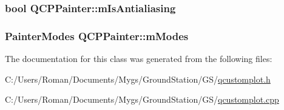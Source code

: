 \subsubsection[{m\+Is\+Antialiasing}]{\setlength{\rightskip}{0pt plus 5cm}bool Q\+C\+P\+Painter\+::m\+Is\+Antialiasing\hspace{0.3cm}{\ttfamily [protected]}}\label{class_q_c_p_painter_a7055085da176aee0f6b23298f1003d08}
\hypertarget{class_q_c_p_painter_af5d1d6e5df0adbc7de5633250fb3396c}{}
\subsubsection[{m\+Modes}]{\setlength{\rightskip}{0pt plus 5cm}Painter\+Modes Q\+C\+P\+Painter\+::m\+Modes\hspace{0.3cm}{\ttfamily [protected]}}\label{class_q_c_p_painter_af5d1d6e5df0adbc7de5633250fb3396c}


The documentation for this class was generated from the following files\+:\begin{DoxyCompactItemize}
\item 
C\+:/\+Users/\+Roman/\+Documents/\+Mygs/\+Ground\+Station/\+G\+S/\hyperlink{qcustomplot_8h}{qcustomplot.\+h}\item 
C\+:/\+Users/\+Roman/\+Documents/\+Mygs/\+Ground\+Station/\+G\+S/\hyperlink{qcustomplot_8cpp}{qcustomplot.\+cpp}\end{DoxyCompactItemize}
